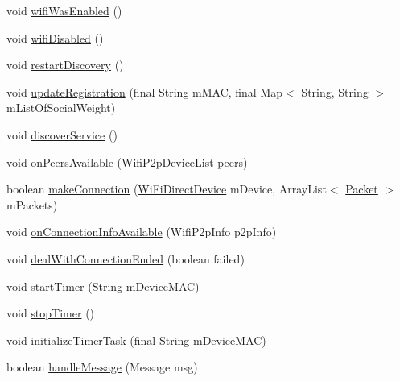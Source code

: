 \begin{DoxyCompactItemize}
\item 
void \hyperlink{classcom_1_1copelabs_1_1oiframework_1_1wifi_1_1_wi_fi_direct_utils_ae61cb2338da82fbbbe9ed599f20d8c1f}{wifi\+Was\+Enabled} ()
\item 
void \hyperlink{classcom_1_1copelabs_1_1oiframework_1_1wifi_1_1_wi_fi_direct_utils_a20181b6d9ff64c44342865ae1c5580b4}{wifi\+Disabled} ()
\item 
void \hyperlink{classcom_1_1copelabs_1_1oiframework_1_1wifi_1_1_wi_fi_direct_utils_aef56711248db2c26e1647f757bf9b4d4}{restart\+Discovery} ()
\item 
void \hyperlink{classcom_1_1copelabs_1_1oiframework_1_1wifi_1_1_wi_fi_direct_utils_ae10f8c8c1a46e71bca770c9659469f32}{update\+Registration} (final String m\+M\+A\+C, final Map$<$ String, String $>$ m\+List\+Of\+Social\+Weight)
\item 
void \hyperlink{classcom_1_1copelabs_1_1oiframework_1_1wifi_1_1_wi_fi_direct_utils_a9f4a5e9253832b8956784d43e634fbd8}{discover\+Service} ()
\item 
void \hyperlink{classcom_1_1copelabs_1_1oiframework_1_1wifi_1_1_wi_fi_direct_utils_aa35c6d687a1f0724748230146d7e20dd}{on\+Peers\+Available} (Wifi\+P2p\+Device\+List peers)
\item 
boolean \hyperlink{classcom_1_1copelabs_1_1oiframework_1_1wifi_1_1_wi_fi_direct_utils_ab3536508624a3c4e523a23944d70d25e}{make\+Connection} (\hyperlink{classcom_1_1copelabs_1_1oiframework_1_1wifi_1_1_wi_fi_direct_device}{Wi\+Fi\+Direct\+Device} m\+Device, Array\+List$<$ \hyperlink{classcom_1_1copelabs_1_1oiframework_1_1contentmanager_1_1_packet}{Packet} $>$ m\+Packets)
\item 
void \hyperlink{classcom_1_1copelabs_1_1oiframework_1_1wifi_1_1_wi_fi_direct_utils_afac424c688482ac47f93ae4744ce2298}{on\+Connection\+Info\+Available} (Wifi\+P2p\+Info p2p\+Info)
\item 
void \hyperlink{classcom_1_1copelabs_1_1oiframework_1_1wifi_1_1_wi_fi_direct_utils_a14fabb0d650c7940b3c8ad3280b0cea1}{deal\+With\+Connection\+Ended} (boolean failed)
\item 
void \hyperlink{classcom_1_1copelabs_1_1oiframework_1_1wifi_1_1_wi_fi_direct_utils_a4a4a356d5cf48af1299b5e4a5da8019d}{start\+Timer} (String m\+Device\+M\+A\+C)
\item 
void \hyperlink{classcom_1_1copelabs_1_1oiframework_1_1wifi_1_1_wi_fi_direct_utils_a7cf1cdb69b703dfedca00235574eeca8}{stop\+Timer} ()
\item 
void \hyperlink{classcom_1_1copelabs_1_1oiframework_1_1wifi_1_1_wi_fi_direct_utils_a5998ce10b37fc5fec935760d4af165f6}{initialize\+Timer\+Task} (final String m\+Device\+M\+A\+C)
\item 
boolean \hyperlink{classcom_1_1copelabs_1_1oiframework_1_1wifi_1_1_wi_fi_direct_utils_a6f55290cbbb8e4c10c5553efe55a9d15}{handle\+Message} (Message msg)
\end{DoxyCompactItemize}
